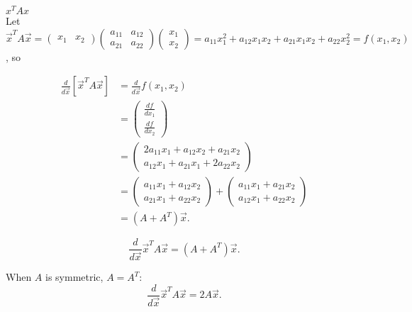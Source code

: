 \documentclass[a4paper]{article}
\begin{document}
\begin{note}{$x^T A x$}\\
  Let  $\vec{x}^T A \vec{x} = \begin{pmatrix} x_1 & x_2 \end{pmatrix} \begin{pmatrix} a_{11} & a_{12} \\ a_{21} & a_{22} \end{pmatrix} 
  \begin{pmatrix} x_1 \\ x_2 \end{pmatrix} = a_{11}x_1^2 + a_{12}x_1 x_2 + a_{21}x_1x_2  + a_{22} x_2^2 = f(x_1,x_2)$, so

  \begin{align*}
    \frac{d}{d\vec{x}} [\vec{x}^T A \vec{x}] &= \frac{d}{d\vec{x}} f(x_1,x_2) \\
                                             &= \begin{pmatrix} \frac{df}{dx_1}\\ \frac{df}{dx_2} \end{pmatrix} \\
                                             &= \begin{pmatrix} 2a_{11} x_1 + a_{12} x_2 + a_{21} x_2 \\ a_{12}x_1 + a_{21}x_1 +2 a_{22}x_2 \end{pmatrix} \\
                                             &= \begin{pmatrix} a_{11}x_1 + a_{12}x_2 \\ a_{21}x_1 + a_{22}x_2 \end{pmatrix} + \begin{pmatrix} a_{11}x_1 + a_{21}x_2 \\ a_{12}x_1 + a_{22}x_2 \end{pmatrix} \\
                                             &= (A + A^T) \vec{x} 
  .\end{align*}
     
\end{note}

\begin{definition}
  \[
    \frac{d}{d\vec{x}} \vec{x}^T A \vec{x} = (A + A^T)\vec{x}
  .\] 
\end{definition}

\begin{corollary}
  When $A$ is symmetric,  $A=A^T$:
  \[
    \frac{d}{d\vec{x}} \vec{x}^T A \vec{x} = 2A\vec{x}
  .\] 
\end{corollary}
\end{document}
